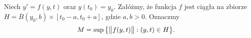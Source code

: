 \begin{theorem}
  Niech $y' = f(y,t)$ oraz $y(t_0) = y_0$. Załóżmy, że funkcja $f$ jest ciągła na zbiorze
  $H = \overline{B}(y_0, b) \times [t_0 - a, t_0 + a]$, gdzie $a, b > 0$. Oznaczmy
  \[
    M = \sup \big\{ \norm[\big]{f(y,t)} : (y, t) \in H \big\}.
  \]
\end{theorem}